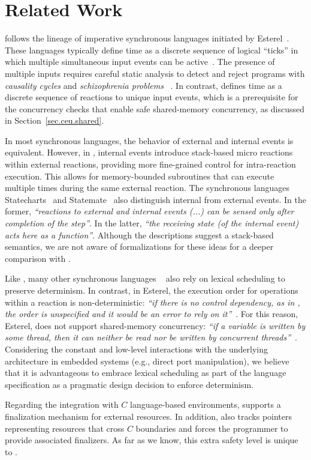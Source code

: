 \section{Related Work}

\CEU follows the lineage of imperative synchronous languages initiated by
Esterel~\cite{esterel.ieee91}.
These languages typically define time as a discrete sequence of logical
``ticks'' in which multiple simultaneous input events can be
active~\cite{ceu.tecs17}.
%
The presence of multiple inputs requires careful static analysis to detect and
reject programs with \emph{causality cycles} and \emph{schizophrenia problems}%
~\cite{esterel.constructive}.
%
In contrast, \CEU defines time as a discrete sequence of reactions to
unique input events, which is a prerequisite for the concurrency checks that
enable safe shared-memory concurrency, as discussed in
Section~\ref{sec.ceu.shared}.

In most synchronous languages, the behavior of external and internal events is
equivalent.
However, in \CEU, internal events introduce stack-based micro reactions within
external reactions, providing more fine-grained control for intra-reaction
execution.
%
This allows for memory-bounded subroutines that can execute multiple times
during the same external reaction.
%
The synchronous languages Statecharts~\cite{statecharts.variants} and
Statemate~\cite{statecharts.statemate} also distinguish internal from external
events.
In the former, \emph{``reactions to external and internal events (...) can be
sensed only after completion of the step''}.
In the latter, \emph{``the receiving state (of the internal event) acts here as
a function''}.
Although the descriptions suggest a stack-based semantics, we are not aware of
formalizations for these ideas for a deeper comparison with \CEU.

Like \CEU, many other synchronous languages%
~\cite{rp.rc,wsn.protothreads,wsn.sol,rp.synchc,rp.pretc}
also rely on lexical scheduling to preserve determinism.
%
In contrast, in Esterel, the execution order for operations within a reaction
is non-deterministic: \emph{``if there is no control dependency, as in
,
the order is unspecified and it would be an error to rely on
it''}~\cite{esterel.primer}.
%
For this reason, Esterel, does not support shared-memory concurrency:
\emph{``if a variable is written by some thread, then it can neither be read
nor be written by concurrent threads''}~\cite{esterel.primer}.
%
Considering the constant and low-level interactions with the underlying
architecture in embedded systems (e.g., direct port manipulation), we believe
that it is advantageous to embrace lexical scheduling as part of the language
specification as a pragmatic design decision to enforce determinism.

Regarding the integration with $C$ language-based environments, \CEU
supports a finalization mechanism for external resources.
%
In addition, \CEU also tracks pointers representing resources that cross $C$
boundaries and forces the programmer to provide associated finalizers.
%
As far as we know, this extra safety level is unique to \CEU.
